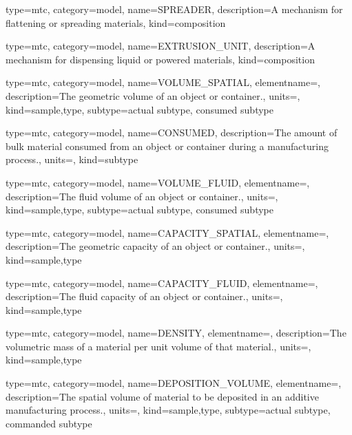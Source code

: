 {
  type=mtc,
  category=model,
  name={SPREADER},
  description={A mechanism for flattening or spreading materials},
  kind={composition}
}


{
  type=mtc,
  category=model,
  name={EXTRUSION\_UNIT},
  description={A mechanism for dispensing liquid or powered materials},
  kind={composition}
}


{
  type=mtc,
  category=model,
  name={VOLUME\_SPATIAL},
  elementname=,
  description={The geometric volume of an object or container.},
  units=,
  kind={sample,type},
  subtype={\gls{actual subtype}, \gls{consumed subtype}}
}


{
  type=mtc,
  category=model,
  name={CONSUMED},
  description={The amount of bulk material consumed from an object or container during a manufacturing process.},
  units=,
  kind={subtype}
}


{
  type=mtc,
  category=model,
  name={VOLUME\_FLUID},
  elementname=,
  description={The fluid volume of an object or container.},
  units=,
  kind={sample,type},
  subtype={\gls{actual subtype}, \gls{consumed subtype}}
}


{
  type=mtc,
  category=model,
  name={CAPACITY\_SPATIAL},
  elementname=,
  description={The geometric capacity of an object or container.},
  units=,
  kind={sample,type}
}


{
  type=mtc,
  category=model,
  name={CAPACITY\_FLUID},
  elementname=,
  description={The fluid capacity of an object or container.},
  units=,
  kind={sample,type}
}


{
  type=mtc,
  category=model,
  name={DENSITY},
  elementname=,
  description={The volumetric mass of a material per unit volume of that material.},
  units=,
  kind={sample,type}
}


{
  type=mtc,
  category=model,
  name={DEPOSITION\_VOLUME},
  elementname=,
  description={The spatial volume of material to be deposited in an additive manufacturing process.},
  units=,
  kind={sample,type},
  subtype={\gls{actual subtype}, \gls{commanded subtype}}
}


